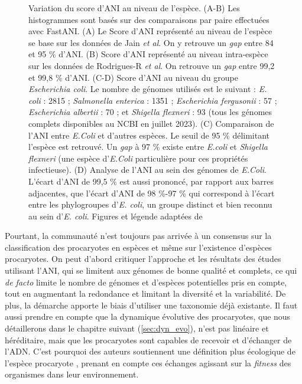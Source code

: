\begin{figure}[htbp]
    \caption[Variation du score d'ANI au niveau de l'espèce]{Variation du score d'ANI au niveau de l'espèce. (A-B) Les histogrammes sont basés sur des comparaisons par paire effectuées avec FastANI. (A) Le Score d'ANI représenté au niveau de l'espèce se base sur les données de Jain \textit{et al}. On y retrouve un \textit{gap} entre 84 et 95 \% d'ANI. (B) Score d'ANI représenté au niveau intra-espèce sur les données de Rodrigues-R \textit{et al}. On retrouve un \textit{gap} entre 99,2 et 99,8 \% d'ANI. (C-D) Score d'ANI au niveau du groupe \textit{Escherichia coli}. Le nombre de génomes utilisés est le suivant : \textit{E. coli} : 2815 ; \textit{Salmonella enterica} : 1351 ; \textit{Escherichia fergusonii} : 57 ; \textit{Escherichia albertii} : 70 ; et \textit{Shigella flexneri} : 93 (tous les génomes complets disponibles au NCBI en juillet 2023). (C) Comparaison de l'ANI entre \textit{E.Coli} et d'autres espèces. Le seuil de 95 \% délimitant l'espèce est retrouvé. Un \textit{gap} à 97 \% existe entre \textit{E.coli} et \textit{Shigella flexneri} (une espèce d'\textit{E.Coli} particulière pour ces propriétés infectieuse). (D) Analyse de l'ANI au sein des génomes de \textit{E.Coli}. L'écart d'ANI de 99,5 \% est aussi prononcé, par rapport aux barres adjacentes, que l'écart d'ANI de 98 \%-97 \% qui correspond à l'écart entre les phylogroupes d'\textit{E. coli}, un groupe distinct et bien reconnu au sein d'\textit{E. coli}. Figures et légende adaptées de \cite{konstantinidis_sequence-discrete_2023}}
    \label{fig:ANI_gap_sp}
\end{figure}


Pourtant, la communauté n'est toujours pas arrivée à un consensus sur la classification des procaryotes en espèces et même sur l'existence d'espèces procaryotes. On peut d'abord critiquer l'approche et les résultats des études utilisant l'ANI, qui se limitent aux génomes de bonne qualité et complets, ce qui \textit{de facto} limite le nombre de génomes et d'espèces potentielles pris en compte, tout en augmentant la redondance et limitant la diversité et la variabilité. De plus, la démarche apporte le biais d'utiliser une taxonomie déjà existante. Il faut aussi prendre en compte que la dynamique évolutive des procaryotes, que nous détaillerons dans le chapitre suivant (\autoref{sec:dyn_evo}), n'est pas linéaire et héréditaire, mais que les procaryotes sont capables de recevoir et d'échanger de l'ADN. C'est pourquoi des auteurs soutiennent une définition plus écologique de l'espèce procaryote \cite{luo_genome_2011}, prenant en compte ces échanges agissant sur la \textit{fitness} des organismes dans leur environnement.


